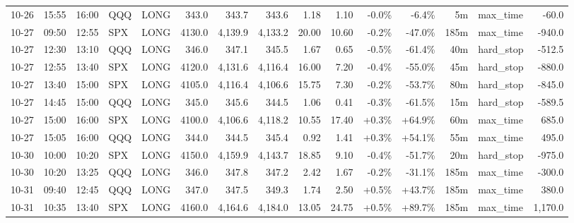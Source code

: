 \documentclass[11pt,a4paper,twoside]{article}
\begin{document}
\begin{landscape}
\begin{center}
\begin{longtable}{>{\color{txtmain}}l l l l l r r r r r r r r >{\color{txtmain}}l r}
10-26 & 15:55 & 16:00 & QQQ & LONG & 343.0 & 343.7 & 343.6 & 1.18 & 1.10 & \textcolor{lossred}{-0.0\%} & \textcolor{lossred}{-6.4\%} & 5m & max\_time & \textcolor{lossred}{-60.0} \\
10-27 & 09:50 & 12:55 & SPX & LONG & 4130.0 & 4,139.9 & 4,133.2 & 20.00 & 10.60 & \textcolor{lossred}{-0.2\%} & \textcolor{lossred}{-47.0\%} & 185m & max\_time & \textcolor{lossred}{-940.0} \\
10-27 & 12:30 & 13:10 & QQQ & LONG & 346.0 & 347.1 & 345.5 & 1.67 & 0.65 & \textcolor{lossred}{-0.5\%} & \textcolor{lossred}{-61.4\%} & 40m & hard\_stop & \textcolor{lossred}{-512.5} \\
10-27 & 12:55 & 13:40 & SPX & LONG & 4120.0 & 4,131.6 & 4,116.4 & 16.00 & 7.20 & \textcolor{lossred}{-0.4\%} & \textcolor{lossred}{-55.0\%} & 45m & hard\_stop & \textcolor{lossred}{-880.0} \\
10-27 & 13:40 & 15:00 & SPX & LONG & 4105.0 & 4,116.4 & 4,106.6 & 15.75 & 7.30 & \textcolor{lossred}{-0.2\%} & \textcolor{lossred}{-53.7\%} & 80m & hard\_stop & \textcolor{lossred}{-845.0} \\
10-27 & 14:45 & 15:00 & QQQ & LONG & 345.0 & 345.6 & 344.5 & 1.06 & 0.41 & \textcolor{lossred}{-0.3\%} & \textcolor{lossred}{-61.5\%} & 15m & hard\_stop & \textcolor{lossred}{-589.5} \\
10-27 & 15:00 & 16:00 & SPX & LONG & 4100.0 & 4,106.6 & 4,118.2 & 10.55 & 17.40 & \textcolor{wingreen}{+0.3\%} & \textcolor{wingreen}{+64.9\%} & 60m & max\_time & \textcolor{wingreen}{685.0} \\
10-27 & 15:05 & 16:00 & QQQ & LONG & 344.0 & 344.5 & 345.4 & 0.92 & 1.41 & \textcolor{wingreen}{+0.3\%} & \textcolor{wingreen}{+54.1\%} & 55m & max\_time & \textcolor{wingreen}{495.0} \\
10-30 & 10:00 & 10:20 & SPX & LONG & 4150.0 & 4,159.9 & 4,143.7 & 18.85 & 9.10 & \textcolor{lossred}{-0.4\%} & \textcolor{lossred}{-51.7\%} & 20m & hard\_stop & \textcolor{lossred}{-975.0} \\
10-30 & 10:20 & 13:25 & QQQ & LONG & 346.0 & 347.8 & 347.2 & 2.42 & 1.67 & \textcolor{lossred}{-0.2\%} & \textcolor{lossred}{-31.1\%} & 185m & max\_time & \textcolor{lossred}{-300.0} \\
10-31 & 09:40 & 12:45 & QQQ & LONG & 347.0 & 347.5 & 349.3 & 1.74 & 2.50 & \textcolor{wingreen}{+0.5\%} & \textcolor{wingreen}{+43.7\%} & 185m & max\_time & \textcolor{wingreen}{380.0} \\
10-31 & 10:35 & 13:40 & SPX & LONG & 4160.0 & 4,164.6 & 4,184.0 & 13.05 & 24.75 & \textcolor{wingreen}{+0.5\%} & \textcolor{wingreen}{+89.7\%} & 185m & max\_time & \textcolor{wingreen}{1,170.0} \\

\end{longtable}
\end{center}
\end{landscape}
\end{document}
